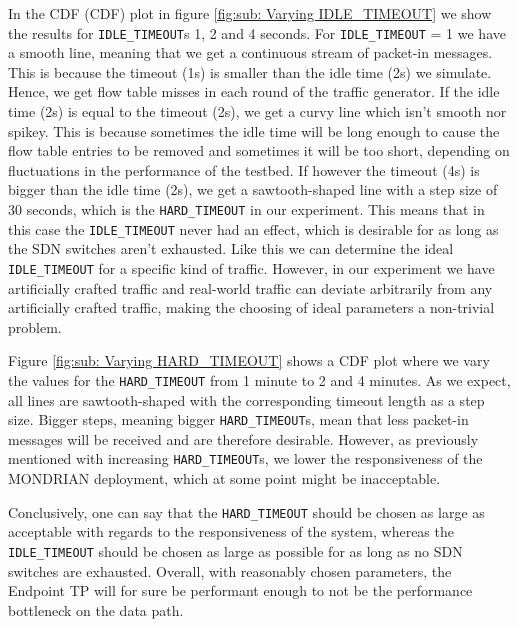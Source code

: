 In the \acs{CDF} (\acl{CDF}) plot in figure \ref{fig:sub: Varying IDLE_TIMEOUT} we show the results for \texttt{IDLE_TIMEOUT}s 1, 2 and 4 seconds. For \texttt{IDLE_TIMEOUT} = 1 we have a smooth line, meaning that we get a continuous stream of packet-in messages. This is because the timeout (1s) is smaller than the idle time (2s) we simulate. Hence, we get flow table misses in each round of the traffic generator. If the idle time (2s) is equal to the timeout (2s), we get a curvy line which isn't smooth nor spikey. This is because sometimes the idle time will be long enough to cause the flow table entries to be removed and sometimes it will be too short, depending on fluctuations in the performance of the testbed. If however the timeout (4s) is bigger than the idle time (2s), we get a sawtooth-shaped line with a step size of 30 seconds, which is the \texttt{HARD_TIMEOUT} in our experiment. This means that in this case the \texttt{IDLE_TIMEOUT} never had an effect, which is desirable for as long as the \acs{SDN} switches aren't exhausted. Like this we can determine the ideal \texttt{IDLE_TIMEOUT} for a specific kind of traffic. However, in our experiment we have artificially crafted traffic and real-world traffic can deviate arbitrarily from any artificially crafted traffic, making the choosing of ideal parameters a non-trivial problem. 

Figure \ref{fig:sub: Varying HARD_TIMEOUT} shows a \acs{CDF} plot where we vary the values for the \texttt{HARD_TIMEOUT} from 1 minute to 2 and 4 minutes. As we expect, all lines are sawtooth-shaped with the corresponding timeout length as a step size. Bigger steps, meaning bigger \texttt{HARD_TIMEOUT}s, mean that less packet-in messages will be received and are therefore desirable. However, as previously mentioned with increasing \texttt{HARD_TIMEOUT}s, we lower the responsiveness of the MONDRIAN deployment, which at some point might be inacceptable.

Conclusively, one can say that the \texttt{HARD_TIMEOUT} should be chosen as large as acceptable with regards to the responsiveness of the system, whereas the \texttt{IDLE_TIMEOUT} should be chosen as large as possible for as long as no \acs{SDN} switches are exhausted. Overall, with reasonably chosen parameters, the Endpoint \acs{TP} will for sure be performant enough to not be the performance bottleneck on the data path.


